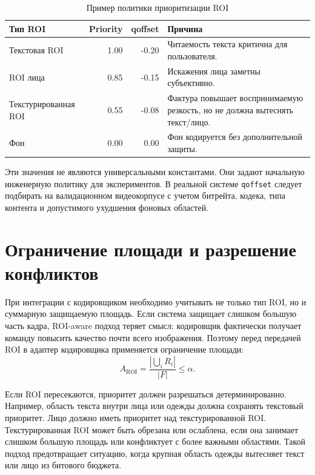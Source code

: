 \documentclass[12pt,a4paper,oneside,openany]{report}
\newcommand{\roi}{\mathrm{ROI}}
\begin{document}
\begin{table}[H]\centering\caption{Пример политики приоритизации ROI}\label{tab:qoffset_policy}\begin{tabularx}{\linewidth}{lrrY}\toprule
Тип ROI & Priority & qoffset & Причина \\
\midrule
Текстовая ROI & 1.00 & -0.20 & Читаемость текста критична для пользователя. \\
ROI лица & 0.85 & -0.15 & Искажения лица заметны субъективно. \\
Текстурированная ROI & 0.55 & -0.08 & Фактура повышает воспринимаемую резкость, но не должна вытеснять текст/лицо. \\
Фон & 0.00 & 0.00 & Фон кодируется без дополнительной защиты. \\
\bottomrule\end{tabularx}
\end{table}

Эти значения не являются универсальными константами. Они задают начальную инженерную политику для экспериментов. В реальной системе \texttt{qoffset} следует подбирать на валидационном видеокорпусе с учетом битрейта, кодека, типа контента и допустимого ухудшения фоновых областей.

\section{Ограничение площади и разрешение конфликтов}

При интеграции с кодировщиком необходимо учитывать не только тип ROI, но и суммарную защищаемую площадь. Если система защищает слишком большую часть кадра, ROI-aware подход теряет смысл: кодировщик фактически получает команду повысить качество почти всего изображения. Поэтому перед передачей ROI в адаптер кодировщика применяется ограничение площади:
\begin{equation}A_{\roi} =\frac{\left|\bigcup_i R_i\right|}{|F|}\leq \alpha.\label{eq:encoder_area_cap}
\end{equation}

Если ROI пересекаются, приоритет должен разрешаться детерминированно. Например, область текста внутри лица или одежды должна сохранять текстовый приоритет. Лицо должно иметь приоритет над текстурированной ROI. Текстурированная ROI может быть обрезана или ослаблена, если она занимает слишком большую площадь или конфликтует с более важными областями. Такой подход предотвращает ситуацию, когда крупная область одежды вытесняет текст или лицо из битового бюджета.
\end{document}
